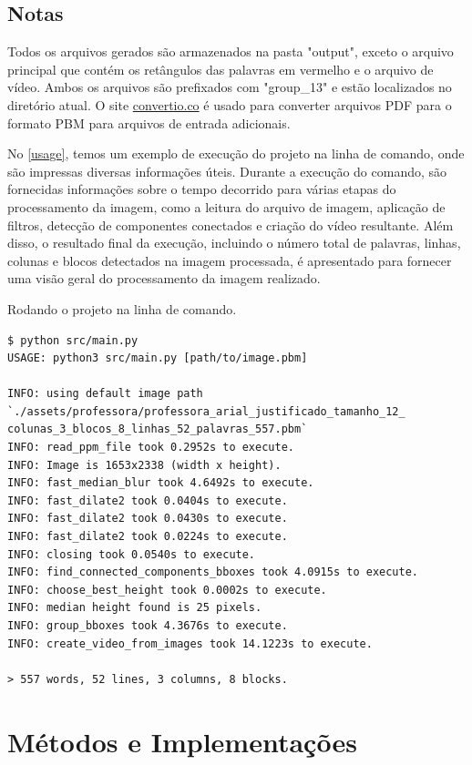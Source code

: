 \documentclass[english, 
               brazil, 
               bsc] %
               {dcomp-abntex2}
\begin{document}
\section{Notas}
Todos os arquivos gerados são armazenados na pasta "output", exceto o arquivo principal que contém os retângulos das palavras em vermelho e o arquivo de vídeo. Ambos os arquivos são prefixados com "group\_13" e estão localizados no diretório atual. O site \href{https://convertio.co/pdf-pbm/}{convertio.co} é usado para converter arquivos PDF para o formato PBM para arquivos de entrada adicionais.

No \autoref{usage}, temos um exemplo de execução do projeto na linha de comando, onde são impressas diversas informações úteis. Durante a execução do comando, são fornecidas informações sobre o tempo decorrido para várias etapas do processamento da imagem, como a leitura do arquivo de imagem, aplicação de filtros, detecção de componentes conectados e criação do vídeo resultante. Além disso, o resultado final da execução, incluindo o número total de palavras, linhas, colunas e blocos detectados na imagem processada, é apresentado para fornecer uma visão geral do processamento da imagem realizado.

\begin{codigo}[h]
  \caption{\small Rodando o projeto na linha de comando.}
 \label{usage}
\begin{lstlisting}
$ python src/main.py                                 
USAGE: python3 src/main.py [path/to/image.pbm]

INFO: using default image path
`./assets/professora/professora_arial_justificado_tamanho_12_
colunas_3_blocos_8_linhas_52_palavras_557.pbm`
INFO: read_ppm_file took 0.2952s to execute.
INFO: Image is 1653x2338 (width x height).
INFO: fast_median_blur took 4.6492s to execute.
INFO: fast_dilate2 took 0.0404s to execute.
INFO: fast_dilate2 took 0.0430s to execute.
INFO: fast_dilate2 took 0.0224s to execute.
INFO: closing took 0.0540s to execute.
INFO: find_connected_components_bboxes took 4.0915s to execute.
INFO: choose_best_height took 0.0002s to execute.
INFO: median height found is 25 pixels.
INFO: group_bboxes took 4.3676s to execute.
INFO: create_video_from_images took 14.1223s to execute.

> 557 words, 52 lines, 3 columns, 8 blocks.
\end{lstlisting}
\end{codigo}


\chapter{Métodos e Implementações}\label{ch-detalhes}
\end{document}
